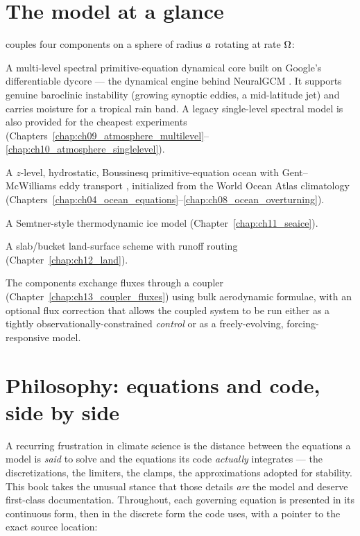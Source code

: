 \section{The model at a glance}

\model{} couples four components on a sphere of radius $a$ rotating at rate $\Omega$:

\begin{description}[leftmargin=0pt,style=nextline]
  \item[Atmosphere] A multi-level spectral primitive-equation dynamical core built on Google's
    differentiable \dino{} dycore --- the dynamical engine behind NeuralGCM
    \citep{kochkov2024neuralgcm}. It supports genuine baroclinic instability (growing synoptic
    eddies, a mid-latitude jet) and carries moisture for a tropical rain band. A legacy
    single-level spectral model is also provided for the cheapest experiments
    (Chapters~\ref{chap:ch09_atmosphere_multilevel}--\ref{chap:ch10_atmosphere_singlelevel}).
  \item[Ocean] A $z$-level, hydrostatic, Boussinesq primitive-equation ocean with
    Gent--McWilliams eddy transport \citep{gentmcwilliams1990}, initialized from the World
    Ocean Atlas climatology (Chapters~\ref{chap:ch04_ocean_equations}--\ref{chap:ch08_ocean_overturning}).
  \item[Sea ice] A Semtner-style thermodynamic ice model \citep{semtner1976}
    (Chapter~\ref{chap:ch11_seaice}).
  \item[Land] A slab/bucket land-surface scheme with runoff routing
    (Chapter~\ref{chap:ch12_land}).
\end{description}

The components exchange fluxes through a coupler (Chapter~\ref{chap:ch13_coupler_fluxes}) using
bulk aerodynamic formulae, with an optional flux correction that allows the coupled system to
be run either as a tightly observationally-constrained \emph{control} or as a freely-evolving,
forcing-responsive model.

\section{Philosophy: equations and code, side by side}

A recurring frustration in climate science is the distance between the equations a model is
\emph{said} to solve and the equations its code \emph{actually} integrates --- the
discretizations, the limiters, the clamps, the approximations adopted for stability. This book
takes the unusual stance that those details \emph{are} the model and deserve first-class
documentation. Throughout, each governing equation is presented in its continuous form, then in
the discrete form the code uses, with a pointer to the exact source location:

